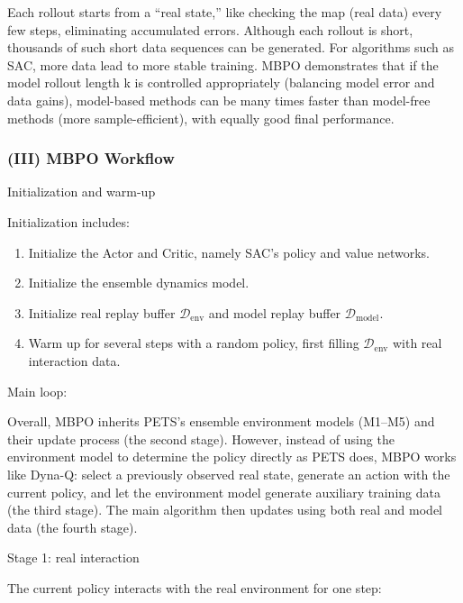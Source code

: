Each rollout starts from a ``real state,'' like checking the map (real data) every few steps, eliminating accumulated errors. Although each rollout is short, thousands of such short data sequences can be generated. For algorithms such as SAC, more data lead to more stable training. MBPO demonstrates that if the model rollout length k is controlled appropriately (balancing model error and data gains), model-based methods can be many times faster than model-free methods (more sample-efficient), with equally good final performance.

\hypertarget{iii-mbpo-workflow}{%
\subsubsection{(III) MBPO Workflow}\label{iii-mbpo-workflow}}

Initialization and warm-up

Initialization includes:

\begin{enumerate}
\def\labelenumi{\arabic{enumi}.}
\tightlist
\item
  Initialize the Actor and Critic, namely SAC's policy and value networks.
\item
  Initialize the ensemble dynamics model.
\item
  Initialize real replay buffer \(\mathcal D_{\mathrm{env}}\) and model replay buffer \(\mathcal D_{\mathrm{model}}\).
\item
  Warm up for several steps with a random policy, first filling \(\mathcal D_{\mathrm{env}}\) with real interaction data.
\end{enumerate}

Main loop:

Overall, MBPO inherits PETS's ensemble environment models (M1--M5) and their update process (the second stage). However, instead of using the environment model to determine the policy directly as PETS does, MBPO works like Dyna-Q: select a previously observed real state, generate an action with the current policy, and let the environment model generate auxiliary training data (the third stage). The main algorithm then updates using both real and model data (the fourth stage).

Stage 1: real interaction

The current policy interacts with the real environment for one step:


